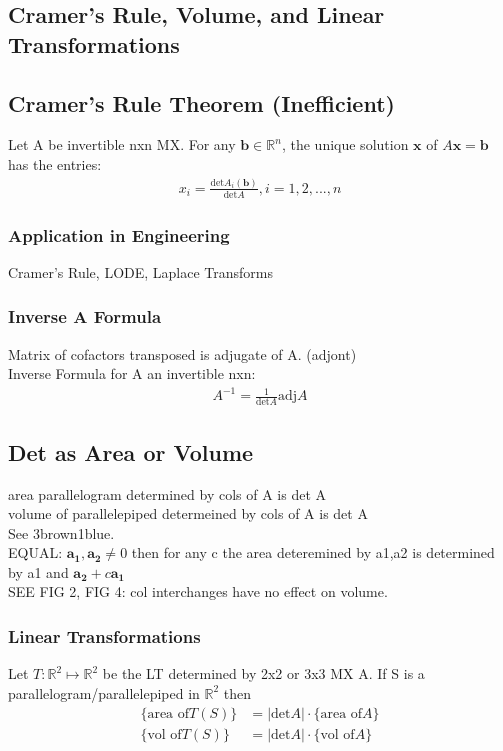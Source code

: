 \documentclass[12pt]{article}
\newcommand{\R}{\mathbb{R}}
\begin{document}
\subsection{Cramer's Rule, Volume, and Linear Transformations}
    \subsection{Cramer's Rule Theorem (Inefficient)}
        Let A be invertible nxn MX. For any $\bm{b}\in\R^n$, the
        unique solution $\bm{x}$  of $A\bm{x}= \bm{b}$  has the entries:
        \begin{align*}
            x_{i} = \frac{\text{det} A_{i}(\bm{b})}{\text{det} A},i= 1,2,...,n
        \end{align*}
    \subsubsection{Application in Engineering}
        Cramer's Rule, LODE, Laplace Transforms
    \subsubsection{Inverse A Formula}
        Matrix of cofactors transposed is adjugate of A. (adjont) \\
        Inverse Formula for A an invertible nxn:
        \begin{align*}
            A^{-1} = \frac{1}{\text{det} A}\text{adj}A
        \end{align*}
    \subsection{Det as Area or Volume}
        area parallelogram determined by cols of A is det A \\
        volume of parallelepiped determeined by cols of A is det A\\
        See 3brown1blue. \\
        EQUAL: $ \bm{a_{1}},\bm{a_{2}}\ne 0 $  then for any c
        the area deteremined by a1,a2 is determined by 
        a1 and $\bm{a_{2}}+ c\bm{a_{1}}$  \\
        SEE FIG 2, FIG 4: col interchanges have no effect on volume.
    \subsubsection{Linear Transformations}
        Let $T:\R^2\mapsto\R^2$ be the LT determined by 2x2 or 3x3 MX A.
        If S is a parallelogram/parallelepiped in $\R^2$ then
        \begin{align*}
            \{\text{area of}T(S)\} &=  |\text{det}A|\cdot \{\text{area of}A\} \\
            \{\text{vol of}T(S)\} &=  |\text{det}A|\cdot \{\text{vol of}A\}
        \end{align*}
\end{document}
